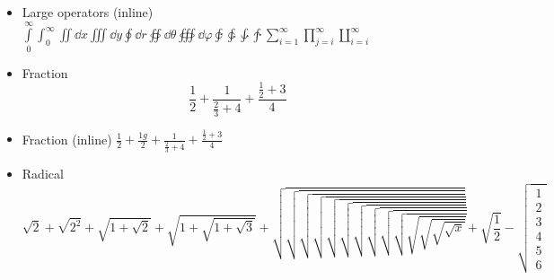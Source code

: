 \documentclass{article}
\begin{document}
\begin{itemize}
  \item Large operators (inline)
        $ \int\limits_0^\infty \int_0^\infty \iint \dd{x} \iiint \dd{y}
          \oint \dd{r} \oiint \dd{\theta} \oiiint \dd{\varphi}\varointclockwise \ointctrclockwise \awint \intclockwise
          \sum_{i=1}^\infty \prod_{j=i}^\infty \coprod_{i=i}^\infty $

  \item Fraction
        \[ \frac{1}{2} + \frac{1}{\frac{2}{3}+4} + \frac{\frac{1}{2}+3}{4} \]

  \item Fraction (inline)
        $ \frac{1}{2} + \frac{1g}{2} + \frac{1}{\frac{2}{3}+4} + \frac{\frac{1}{2}+3}{4} $

  \item Radical
        \[
            \sqrt{2} + \sqrt{2^2} + \sqrt{1+\sqrt{2}} + \sqrt{1+\sqrt{1+\sqrt{3}}}
          + \sqrt{\sqrt{\sqrt{\sqrt{\sqrt{\sqrt{\sqrt{\sqrt{\sqrt{\sqrt{\sqrt{\sqrt{\sqrt{\sqrt{x}}}}}}}}}}}}}} + \sqrt{\frac{1}{2}}-\sqrt{\begin{matrix}
          	1\\2\\3\\4\\5\\6
          	\end{matrix}}
        \]


\end{itemize}
\end{document}

